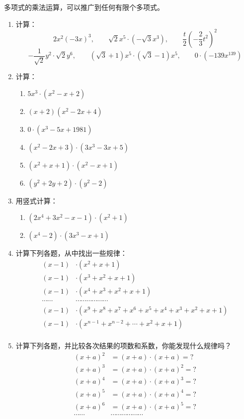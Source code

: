 多项式的乘法运算，可以推广到任何有限个多项式。

\begin{ex}
\begin{enumerate}
    \item 计算：
    \[2x^2(-3x)^3,\qquad \sqrt{2}x^5\cdot (-\sqrt{3}x^3),\qquad \frac{t}{2}\left(-\frac{2}{3}t^2\right)^2 \]
    \[-\frac{1}{\sqrt{2}}y^2\cdot \sqrt{2}y^6,\qquad (\sqrt{3}+1)x^5\cdot (\sqrt{3}-1)x^5,\qquad 0\cdot (-139x^{139}) \]
    \item 计算：
    \begin{multicols}{2}
    \begin{enumerate}
        \item $5x^3\cdot (x^2-x+2)$
        \item $(x+2)(x^2-2x+4)$
        \item $0\cdot (x^3-5x+1981)$
        \item $(x^2-2x+3)\cdot (3x^3-3x+5)$
        \item $(x^2+x+1)\cdot (x^2-x+1)$
        \item $(y^2+2y+2)\cdot(y^2-2)$
    \end{enumerate}
    \end{multicols}
    \item 用竖式计算：
\begin{enumerate}
    \item $(2x^4+3x^2-x-1)\cdot (x^2+1)$
    \item $(x^4-2)\cdot (3x^3-x+1)$
\end{enumerate}
\item 计算下列各题，从中找出一些规律：
\[\begin{split}
    (x-1)&\cdot (x^2+x+1)\\
    (x-1)&\cdot (x^3+x^2+x+1)\\
    (x-1)&\cdot (x^4+x^3+x^2+x+1)\\
    \cdots\cdots & \cdots\cdots \cdots\cdots \cdots\cdots \\
    (x-1)&\cdot (x^9+x^8+x^7+x^6+x^5+x^4+x^3+x^2+x+1)\\
    (x-1)&\cdot (x^{n-1}+x^{n-2}+\cdots+x^2+x+1)\\
\end{split}\]

\item 计算下列各题，并比较各次结果的项数和系数，你能发现什么规律吗？
\[\begin{split}
    (x+a)^2&=(x+a)\cdot (x+a)=?\\
    (x+a)^3&=(x+a)\cdot (x+a)^2=?\\
    (x+a)^4&=(x+a)\cdot (x+a)^3=?\\
    (x+a)^5&=(x+a)\cdot (x+a)^4=?\\
    (x+a)^6&=(x+a)\cdot (x+a)^5=?\\
\cdots\cdots &\cdots\cdots \cdots\cdots \cdots\cdots \\
\end{split}\]
\end{enumerate}
\end{ex}

